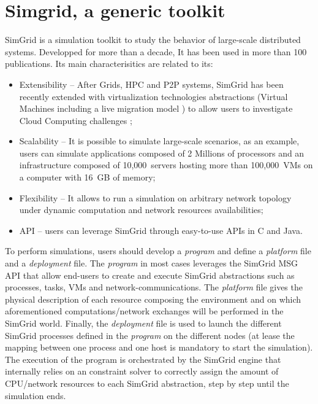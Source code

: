 \documentclass[conference]{IEEEtran}
\newcommand{\sg}{SimGrid\xspace}
\begin{document}
\section{Simgrid, a generic toolkit}
\label{sec:sg}

\sg is a simulation toolkit to study the behavior of
large-scale distributed systems.  Developped for more than  a decade, It has been used in more than 100
publications.  Its main characterisitics are related to its:
\begin{itemize}
\item Extensibility -- After Grids, HPC and P2P
  systems, \sg has been recently extended with virtualization technologies abstractions
(\ie Virtual Machines including a live migration model \cite{Hirofuchi:2013:ALM:2568486.2568524}) to allow users to investigate Cloud
Computing challenges \cite{lucas:cloud2014};
\item Scalability -- It is possible to simulate large-scale scenarios,
  as an example, users can simulate applications composed of 2
  Millions of processors and an infrastructure composed of 10,000~servers hosting more than
  100,000~VMs on a computer with 16~GB of memory;
\item  Flexibility -- It allows to run a simulation on arbitrary network
  topology under dynamic computation and network resources
  availabilities;
\item API --  users can leverage \sg through easy-to-use APIs in C
  and Java.
\end{itemize}

To perform simulations, users should develop a \emph{program} and
define a \emph{platform} file and a \emph{deployment} file. The
\emph{program} in most cases leverages the \sg MSG API that allow
end-users to create and execute \sg abstractions such as processes,
tasks, VMs and network-communications. The \emph{platform} file gives
the physical description of each resource composing the environment
and on which aforementioned computations/network exchanges will be
performed in the \sg
world.%
Finally, the \emph{deployment} file is used to launch the different
\sg processes defined in the \emph{program} on the different nodes (at
lease the mapping between one process and one host is mandatory to
start the simulation). The execution of the program is orchestrated by
the \sg engine that internally relies on an constraint solver to
correctly assign the amount of CPU/network resources to each \sg
abstraction, step by step until the simulation ends.
\end{document}
